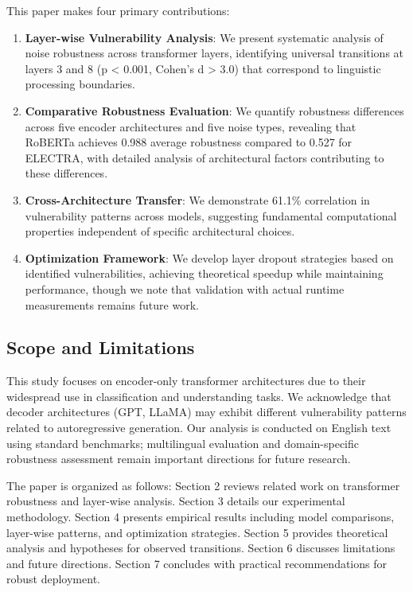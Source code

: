 This paper makes four primary contributions:

\begin{enumerate}
\item \textbf{Layer-wise Vulnerability Analysis}: We present systematic analysis of noise robustness across transformer layers, identifying universal transitions at layers 3 and 8 (p < 0.001, Cohen's d > 3.0) that correspond to linguistic processing boundaries.

\item \textbf{Comparative Robustness Evaluation}: We quantify robustness differences across five encoder architectures and five noise types, revealing that RoBERTa achieves 0.988 average robustness compared to 0.527 for ELECTRA, with detailed analysis of architectural factors contributing to these differences.

\item \textbf{Cross-Architecture Transfer}: We demonstrate 61.1\% correlation in vulnerability patterns across models, suggesting fundamental computational properties independent of specific architectural choices.

\item \textbf{Optimization Framework}: We develop layer dropout strategies based on identified vulnerabilities, achieving theoretical speedup while maintaining performance, though we note that validation with actual runtime measurements remains future work.
\end{enumerate}

\subsection{Scope and Limitations}

This study focuses on encoder-only transformer architectures due to their widespread use in classification and understanding tasks. We acknowledge that decoder architectures (GPT, LLaMA) may exhibit different vulnerability patterns related to autoregressive generation. Our analysis is conducted on English text using standard benchmarks; multilingual evaluation and domain-specific robustness assessment remain important directions for future research.

The paper is organized as follows: Section 2 reviews related work on transformer robustness and layer-wise analysis. Section 3 details our experimental methodology. Section 4 presents empirical results including model comparisons, layer-wise patterns, and optimization strategies. Section 5 provides theoretical analysis and hypotheses for observed transitions. Section 6 discusses limitations and future directions. Section 7 concludes with practical recommendations for robust deployment.